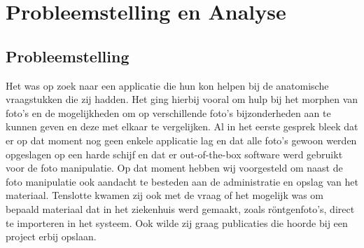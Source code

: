 \chapter{Probleemstelling en Analyse}
\label{Probleemstelling_en_analyse}
\section{Probleemstelling}
Het \casamproject was op zoek naar een applicatie die hun kon helpen bij de anatomische vraagstukken die zij hadden. 
Het ging hierbij vooral om hulp bij het morphen van foto's en de mogelijkheden om op verschillende foto's bijzonderheden aan te kunnen geven en deze met elkaar te vergelijken. 
Al in het eerste gesprek bleek dat er op dat moment nog geen enkele applicatie lag en dat alle foto's gewoon werden opgeslagen op een harde schijf en dat er out-of-the-box software werd gebruikt voor de foto manipulatie. 
Op dat moment hebben wij voorgesteld om naast de foto manipulatie ook aandacht te besteden aan de administratie en opslag van het materiaal.
Tenslotte kwamen zij ook met de vraag of het mogelijk was om bepaald materiaal dat in het ziekenhuis werd gemaakt, zoals r\"{o}ntgenfoto's, direct te importeren in het systeem. Ook wilde zij graag publicaties die hoorde bij een project erbij opslaan.


